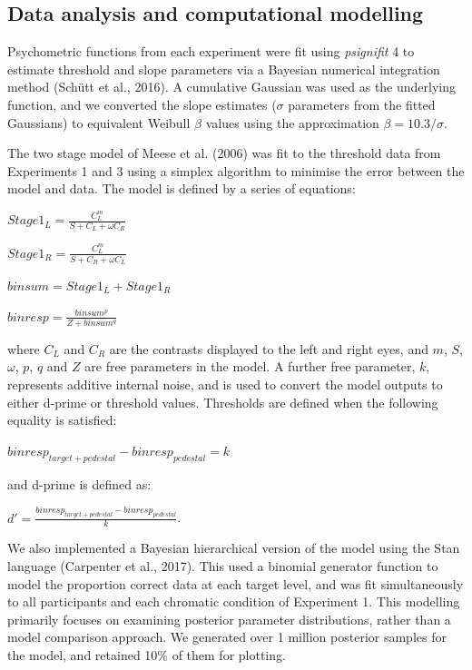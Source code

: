 \documentclass[
]{article}
\begin{document}
\hypertarget{data-analysis-and-computational-modelling}{%
\subsection{Data analysis and computational modelling}\label{data-analysis-and-computational-modelling}}

Psychometric functions from each experiment were fit using \emph{psignifit} 4 to estimate threshold and slope parameters via a Bayesian numerical integration method (Schütt et al., 2016). A cumulative Gaussian was used as the underlying function, and we converted the slope estimates (\(\sigma\) parameters from the fitted Gaussians) to equivalent Weibull \(\beta\) values using the approximation \(\beta = 10.3/\sigma\).

The two stage model of Meese et al. (2006) was fit to the threshold data from Experiments 1 and 3 using a simplex algorithm to minimise the error between the model and data. The model is defined by a series of equations:

\(Stage1_L = \frac{C_L^m}{S + C_L + \omega C_R}\)

\(Stage1_R = \frac{C_L^m}{S + C_R + \omega C_L}\)

\(binsum = Stage1_L + Stage1_R\)

\(binresp = \frac{binsum^p}{Z + binsum^q}\)

where \(C_L\) and \(C_R\) are the contrasts displayed to the left and right eyes, and \(m\), \(S\), \(\omega\), \(p\), \(q\) and \(Z\) are free parameters in the model. A further free parameter, \(k\), represents additive internal noise, and is used to convert the model outputs to either d-prime or threshold values. Thresholds are defined when the following equality is satisfied:

\(binresp_{target+pedestal} - binresp_{pedestal} = k\)

and d-prime is defined as:

\(d' = \frac{binresp_{target+pedestal} - binresp_{pedestal}}{k}\).

We also implemented a Bayesian hierarchical version of the model using the Stan language (Carpenter et al., 2017). This used a binomial generator function to model the proportion correct data at each target level, and was fit simultaneously to all participants and each chromatic condition of Experiment 1. This modelling primarily focuses on examining posterior parameter distributions, rather than a model comparison approach. We generated over 1 million posterior samples for the model, and retained 10\% of them for plotting.
\end{document}

